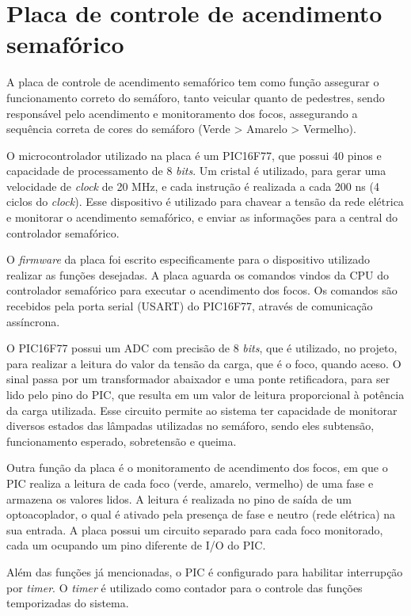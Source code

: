 \section{Placa de controle de acendimento semafórico}

A placa de controle de acendimento semafórico tem como função assegurar o funcionamento correto do semáforo, tanto veicular quanto de pedestres, sendo responsável pelo acendimento e monitoramento dos focos, assegurando a sequência correta de cores do semáforo (Verde > Amarelo > Vermelho).

O microcontrolador utilizado na placa é um PIC16F77, que possui 40 pinos e capacidade de processamento de 8 \textit{bits}. Um cristal é utilizado, para gerar uma velocidade de \textit{clock} de 20 MHz, e cada instrução é realizada a cada 200 ns (4 ciclos do \textit{clock}). Esse dispositivo é utilizado para chavear a tensão da rede elétrica e monitorar o acendimento semafórico, e enviar as informações para a central do controlador semafórico.

O \textit{firmware} da placa foi escrito especificamente para o dispositivo utilizado realizar as funções desejadas. A placa aguarda os comandos vindos da \ac{CPU} do controlador semafórico para executar o acendimento dos focos. Os comandos são recebidos pela porta serial (\ac{USART}) do PIC16F77, através de comunicação assíncrona.

O PIC16F77 possui um \ac{ADC} com precisão de 8 \textit{bits}, que é utilizado, no projeto, para realizar a leitura do valor da tensão da carga, que é o foco, quando aceso. O sinal passa por um transformador abaixador e uma ponte retificadora, para ser lido pelo pino do PIC, que resulta em um valor de leitura proporcional à potência da carga utilizada. Esse circuito permite ao sistema ter capacidade de monitorar diversos estados das lâmpadas utilizadas no semáforo, sendo eles subtensão, funcionamento esperado, sobretensão e queima.

Outra função da placa é o monitoramento de acendimento dos focos, em que o PIC realiza a leitura de cada foco (verde, amarelo, vermelho) de uma fase e armazena os valores lidos. A leitura é realizada no pino de saída de um optoacoplador, o qual é ativado pela presença de fase e neutro (rede elétrica) na sua entrada. A placa possui um circuito separado para cada foco monitorado, cada um ocupando um pino diferente de \ac{I/O} do PIC.

Além das funções já mencionadas, o PIC é configurado para habilitar interrupção por \textit{timer}. O \textit{timer} é utilizado como contador para o controle das funções temporizadas do sistema. 

